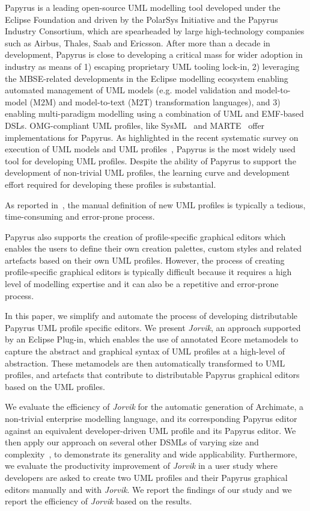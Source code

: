 Papyrus \cite{lanusse2009papyrus} is a leading open-source UML modelling tool developed under the Eclipse Foundation and driven by the PolarSys Initiative and the Papyrus Industry Consortium, which are spearheaded by large high-technology companies such as Airbus, Thales, Saab and Ericsson. 
After more than a decade in development, Papyrus is close to developing a critical mass for wider adoption in industry as means of 1) escaping proprietary UML tooling lock-in, 2) leveraging the MBSE-related developments in the Eclipse modelling ecosystem enabling automated management of UML models (e.g. model validation and model-to-model (M2M) and model-to-text (M2T) transformation languages), and 3) enabling multi-paradigm modelling using a combination of UML and EMF-based DSLs. 
OMG-compliant UML profiles, like SysML~\cite{friedenthal2014practical} and MARTE~\cite{omg2011marte} offer implementations for Papyrus. 
As highlighted in the recent systematic survey on execution of UML models and UML profiles~\cite{ciccozzi2018execution}, Papyrus is the most widely used tool for developing UML profiles.
Despite the ability of Papyrus to support the development of non-trivial UML profiles, the learning curve and development effort required for developing these profiles is substantial.

As reported in~\cite{Wimmer2009:IJWIS}, the manual definition of new UML profiles is typically a tedious, time-consuming and error-prone process.

Papyrus also supports the creation of profile-specific graphical editors which enables the users to define their own creation palettes, custom styles and related artefacts based on their own UML profiles. 
However, the process of creating profile-specific graphical editors is typically difficult because it requires a high level of modelling expertise and it can also be a repetitive and error-prone process.

In this paper, we simplify and automate the process of developing distributable Papyrus UML profile specific editors. 
We present \textit{Jorvik}, an approach supported by an Eclipse Plug-in, which enables the use of annotated Ecore metamodels to capture the abstract and graphical syntax of UML profiles at a high-level of abstraction. These metamodels are then automatically transformed to UML profiles, and artefacts that contribute to distributable Papyrus graphical editors based on the UML profiles. 


We evaluate the efficiency of \textit{Jorvik} for the automatic generation of Archimate, a non-trivial enterprise modelling language, and its corresponding Papyrus editor against an equivalent developer-driven UML profile and its Papyrus editor. 
We then apply our approach on several other DSMLs of varying size and complexity~\cite{williams2013metamodels}, to demonstrate its generality and wide applicability. 
Furthermore, we evaluate the productivity improvement of \textit{Jorvik} in a user study where developers are asked to create two UML profiles and their Papyrus graphical editors manually and with \textit{Jorvik}.
We report the findings of our study and we report the efficiency of \textit{Jorvik} based on the results. 

